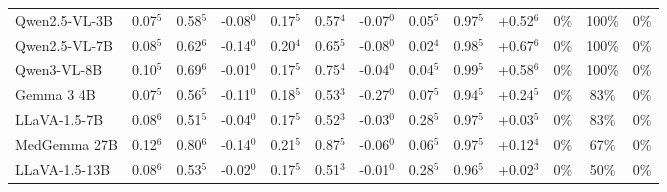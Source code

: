 \documentclass[11pt]{article}
\begin{document}
\begin{table}[t]
{\begin{tabular}{l@{\hspace{3pt}}ccc@{\hspace{4pt}}ccc@{\hspace{4pt}}ccc@{\hspace{4pt}}ccc}
Qwen2.5-VL-3B & \cellcolor{cfSage2}0.07$^{5}$ & \cellcolor{cfSage1}0.58$^{5}$ & \cellcolor{cfSlate2}-0.08$^{0}$ & \cellcolor{cfSage3}0.17$^{5}$ & \cellcolor{cfSage1}0.57$^{4}$ & \cellcolor{cfSlate2}-0.07$^{0}$ & \cellcolor{cfSage1}0.05$^{5}$ & \cellcolor{cfSage4}0.97$^{5}$ & \cellcolor{cfTerra4}+0.52$^{6}$ & \cellcolor{cfTerra1}0\% & \cellcolor{cfTerra4}100\% & 0\% \\
Qwen2.5-VL-7B & \cellcolor{cfSage2}0.08$^{5}$ & \cellcolor{cfSage2}0.62$^{6}$ & \cellcolor{cfSlate3}-0.14$^{0}$ & \cellcolor{cfSage3}0.20$^{4}$ & \cellcolor{cfSage2}0.65$^{5}$ & \cellcolor{cfSlate2}-0.08$^{0}$ & \cellcolor{cfSage1}0.02$^{4}$ & \cellcolor{cfSage4}0.98$^{5}$ & \cellcolor{cfTerra4}+0.67$^{6}$ & \cellcolor{cfTerra1}0\% & \cellcolor{cfTerra4}100\% & 0\% \\
Qwen3-VL-8B & \cellcolor{cfSage2}0.10$^{5}$ & \cellcolor{cfSage2}0.69$^{6}$ & \cellcolor{cfSlate1}-0.01$^{0}$ & \cellcolor{cfSage3}0.17$^{5}$ & \cellcolor{cfSage2}0.75$^{4}$ & \cellcolor{cfSlate2}-0.04$^{0}$ & \cellcolor{cfSage1}0.04$^{5}$ & \cellcolor{cfSage4}0.99$^{5}$ & \cellcolor{cfTerra4}+0.58$^{6}$ & \cellcolor{cfTerra1}0\% & \cellcolor{cfTerra4}100\% & 0\% \\
Gemma 3 4B & \cellcolor{cfSage2}0.07$^{5}$ & \cellcolor{cfSage1}0.56$^{5}$ & \cellcolor{cfSlate3}-0.11$^{0}$ & \cellcolor{cfSage3}0.18$^{5}$ & \cellcolor{cfSage1}0.53$^{3}$ & \cellcolor{cfSlate4}-0.27$^{0}$ & \cellcolor{cfSage2}0.07$^{5}$ & \cellcolor{cfSage4}0.94$^{5}$ & \cellcolor{cfTerra3}+0.24$^{5}$ & \cellcolor{cfTerra1}0\% & \cellcolor{cfTerra3}83\% & 0\% \\
LLaVA-1.5-7B & \cellcolor{cfSage2}0.08$^{6}$ & \cellcolor{cfSage1}0.51$^{5}$ & \cellcolor{cfSlate2}-0.04$^{0}$ & \cellcolor{cfSage3}0.17$^{5}$ & \cellcolor{cfSage1}0.52$^{3}$ & \cellcolor{cfSlate2}-0.03$^{0}$ & \cellcolor{cfSage4}0.28$^{5}$ & \cellcolor{cfSage4}0.97$^{5}$ & \cellcolor{cfTerra2}+0.03$^{5}$ & \cellcolor{cfTerra1}0\% & \cellcolor{cfTerra3}83\% & 0\% \\
MedGemma 27B & \cellcolor{cfSage3}0.12$^{6}$ & \cellcolor{cfSage3}0.80$^{6}$ & \cellcolor{cfSlate3}-0.14$^{0}$ & \cellcolor{cfSage4}0.21$^{5}$ & \cellcolor{cfSage3}0.87$^{5}$ & \cellcolor{cfSlate2}-0.06$^{0}$ & \cellcolor{cfSage2}0.06$^{5}$ & \cellcolor{cfSage4}0.97$^{5}$ & \cellcolor{cfTerra3}+0.12$^{4}$ & \cellcolor{cfTerra1}0\% & \cellcolor{cfTerra3}67\% & 0\% \\
LLaVA-1.5-13B & \cellcolor{cfSage2}0.08$^{6}$ & \cellcolor{cfSage1}0.53$^{5}$ & \cellcolor{cfSlate2}-0.02$^{0}$ & \cellcolor{cfSage3}0.17$^{5}$ & \cellcolor{cfSage1}0.51$^{3}$ & \cellcolor{cfSlate1}-0.01$^{0}$ & \cellcolor{cfSage4}0.28$^{5}$ & \cellcolor{cfSage4}0.96$^{5}$ & \cellcolor{cfTerra2}+0.02$^{3}$ & \cellcolor{cfTerra1}0\% & \cellcolor{cfTerra3}50\% & 0\% \\

\end{tabular}}
\end{table}
\end{document}
